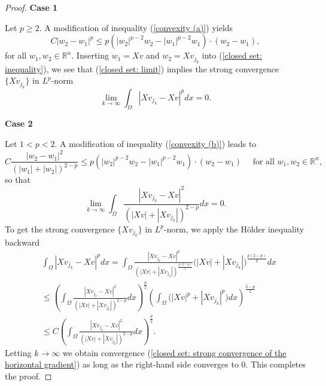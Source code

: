 \documentclass[a4paper,12pt,reqno]{amsart}
\renewcommand\eqref[1]{(\ref{#1})} %
\numberwithin{equation}{section}
\theoremstyle{plain}
\theoremstyle{definition}
\begin{document}
\begin{proof}
\textbf{Case 1}

Let $p\geq 2$. A modification of inequality \eqref{convexity (a)} yields
\begin{equation}\label{closed set: inequality}
C\left|w_{2}-w_{1}\right|^{p} \leq p\left(\left|w_{2}\right|^{p-2} w_{2}-\left|w_{1}\right|^{p-2} w_{1}\right) \cdot\left(w_{2}-w_{1}\right),
\end{equation}
for all $w_{1}, w_{2} \in \mathbb{R}^{n}$. Inserting $w_{1}=Xv$ and $w_{2}=X v_{j_{k}}$ into \eqref{closed set: inequality}, we see that \eqref{closed set: limit} implies the strong convergence $\{X v_{j_{k}}\}$ in $L^{p}$-norm 
$$
\lim _{k \rightarrow \infty} \int_{\Omega}\left|X v_{j_{k}}-X v\right|^{p} d x=0 .
$$

\textbf{Case 2}

Let $1<p<2$.
A modification of inequality \eqref{convexity (b)} leads to
\begin{equation*}
C\frac{|w_{2}-w_{1}|^{2}}{(|w_{1}|+|w_{2}|)^{2-p}}   \leq p\left(\left|w_{2}\right|^{p-2} w_{2}-\left|w_{1}\right|^{p-2} w_{1}\right)\cdot\left(w_{2}-w_{1}\right) \quad \text{ for all }w_{1}, w_{2} \in \mathbb{R}^{n},
\end{equation*}
so that
\begin{equation*}
\lim_{k\to\infty}\int_{\Omega}\frac{|X v_{j_{k}}-X v|^{2}}{(|X v|+|X v_{j_{k}}|)^{2-p}}dx=0.
\end{equation*}
To get the strong convergence $\{X v_{j_{k}}\}$ in $L^{p}$-norm, we apply the H\"older inequality backward
\begin{equation*}
\begin{aligned}
&\int_{\Omega}|X v_{j_{k}}-X v|^{p}dx=\int_{\Omega}\frac{|X v_{j_{k}}-X v|^{p}}{(|X v|+|X v_{j_{k}}|)^{\frac{p(2-p)}{2}}}(|X v|+|X v_{j_{k}}|\big)^{\frac{p(2-p)}{2}}dx
\\
&\leq\left(\int_{\Omega}\frac{|X v_{j_{k}}-X v|^{2}}{(|X v|+|X v_{j_{k}}|)^{2-p}}dx \right)^{\frac{p}{2}}
\left(\int_{\Omega}\Big(|X v|^{p}+|X v_{j_{k}}|^{p}\Big)dx \right)^{\frac{2-p}{2}}
\\
&\leq C\left(\int_{\Omega}\frac{|X v_{j_{k}}-X v|^{2}}{(|X v|+|X v_{j_{k}}|)^{2-p}}dx \right)^{\frac{p}{2}}.
\end{aligned}
\end{equation*}
Letting $k\to\infty$ we obtain convergence \eqref{closed set: strong convergence of the horizontal gradient} as long as the right-hand side converges to 0. This completes the proof.
\end{proof}
\end{document}
